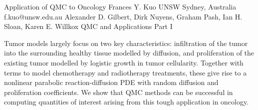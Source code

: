\begin{talk}
  {Application of QMC to Oncology}%
  {Frances Y. Kuo}%
  {UNSW Sydney, Australia}%
  {f.kuo@unsw.edu.au}%
  {Alexander D. Gilbert, Dirk Nuyens, Graham Pash, Ian H. Sloan, Karen E. Willkox}%
  {QMC and Applications Part I}%
    
   
Tumor models largely focus on two key characteristics: infiltration of the tumor into the surrounding healthy tissue modelled by diffusion, and proliferation of the existing tumor modelled by logistic growth in tumor cellularity. Together with terms to model chemotherapy and radiotherapy treatments, these give rise to a nonlinear parabolic reaction-diffusion PDE with random diffusion and proliferation coefficients. We show that QMC methods can be successful in computing quantities of interest arising from this tough application in oncology.

%
%
\end{talk}
